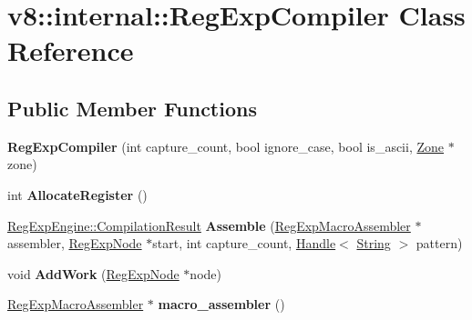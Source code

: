 \hypertarget{classv8_1_1internal_1_1_reg_exp_compiler}{}\section{v8\+:\+:internal\+:\+:Reg\+Exp\+Compiler Class Reference}
\label{classv8_1_1internal_1_1_reg_exp_compiler}
\subsection*{Public Member Functions}
\begin{DoxyCompactItemize}
\item 
\hypertarget{classv8_1_1internal_1_1_reg_exp_compiler_a1bbbdd7bbf15c63476b089d76e839ee1}{}{\bfseries Reg\+Exp\+Compiler} (int capture\+\_\+count, bool ignore\+\_\+case, bool is\+\_\+ascii, \hyperlink{classv8_1_1internal_1_1_zone}{Zone} $\ast$zone)\label{classv8_1_1internal_1_1_reg_exp_compiler_a1bbbdd7bbf15c63476b089d76e839ee1}

\item 
\hypertarget{classv8_1_1internal_1_1_reg_exp_compiler_ab202d545cb1d4f3f57b85ecb74c9f0dc}{}int {\bfseries Allocate\+Register} ()\label{classv8_1_1internal_1_1_reg_exp_compiler_ab202d545cb1d4f3f57b85ecb74c9f0dc}

\item 
\hypertarget{classv8_1_1internal_1_1_reg_exp_compiler_a83cacd8796d13f5de3ad21b58f25f9e6}{}\hyperlink{structv8_1_1internal_1_1_reg_exp_engine_1_1_compilation_result}{Reg\+Exp\+Engine\+::\+Compilation\+Result} {\bfseries Assemble} (\hyperlink{classv8_1_1internal_1_1_reg_exp_macro_assembler}{Reg\+Exp\+Macro\+Assembler} $\ast$assembler, \hyperlink{classv8_1_1internal_1_1_reg_exp_node}{Reg\+Exp\+Node} $\ast$start, int capture\+\_\+count, \hyperlink{classv8_1_1internal_1_1_handle}{Handle}$<$ \hyperlink{classv8_1_1internal_1_1_string}{String} $>$ pattern)\label{classv8_1_1internal_1_1_reg_exp_compiler_a83cacd8796d13f5de3ad21b58f25f9e6}

\item 
\hypertarget{classv8_1_1internal_1_1_reg_exp_compiler_adf4f9531f979b4fabc5a5b940e46f315}{}void {\bfseries Add\+Work} (\hyperlink{classv8_1_1internal_1_1_reg_exp_node}{Reg\+Exp\+Node} $\ast$node)\label{classv8_1_1internal_1_1_reg_exp_compiler_adf4f9531f979b4fabc5a5b940e46f315}

\item 
\hypertarget{classv8_1_1internal_1_1_reg_exp_compiler_a88e7171c0c8e22dd570bd83941822448}{}\hyperlink{classv8_1_1internal_1_1_reg_exp_macro_assembler}{Reg\+Exp\+Macro\+Assembler} $\ast$ {\bfseries macro\+\_\+assembler} ()\label{classv8_1_1internal_1_1_reg_exp_compiler_a88e7171c0c8e22dd570bd83941822448}


\end{DoxyCompactItemize}
